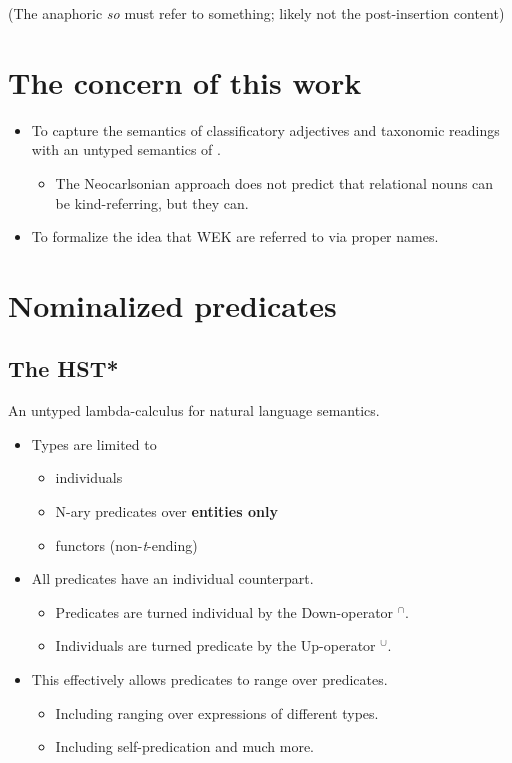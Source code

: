 \documentclass[a4paper,12pt]{article}
\begin{document}
(The anaphoric \textit{so} must refer to something; likely not the post-insertion content)

\section{The concern of this work}

\begin{itemize}
    \item To capture the semantics of classificatory adjectives and taxonomic readings with an untyped semantics of \textcite{chierchia1984topicssyntaxsemantics}.
    \begin{itemize}
        \item The Neocarlsonian approach does not predict that relational nouns can be kind-referring, but they can.
    \end{itemize}
    \item To formalize the idea that WEK are referred to via proper names.
\end{itemize}

\section{Nominalized predicates}
\subsection{The HST* \parencite{cocchiarella1974fregeansemanticsrealist,chierchia1984topicssyntaxsemantics}}

An untyped lambda-calculus for natural language semantics.

\begin{itemize}
    \item Types are limited to
    \begin{itemize}
        \item individuals
        \item N-ary predicates over \textbf{entities only}
        \item functors (non-\textit{t}-ending)
    \end{itemize}
    \item All predicates have an individual counterpart.
    \begin{itemize}
        \item Predicates are turned individual by the Down-operator $^\cap $.
        \item Individuals are turned predicate by the Up-operator $^\cup $.
    \end{itemize}
    \item This effectively allows predicates to range over predicates.
    \begin{itemize}
        \item Including ranging over expressions of different types.
        \item Including self-predication and much more.
    \end{itemize}
\end{itemize}
\end{document}
